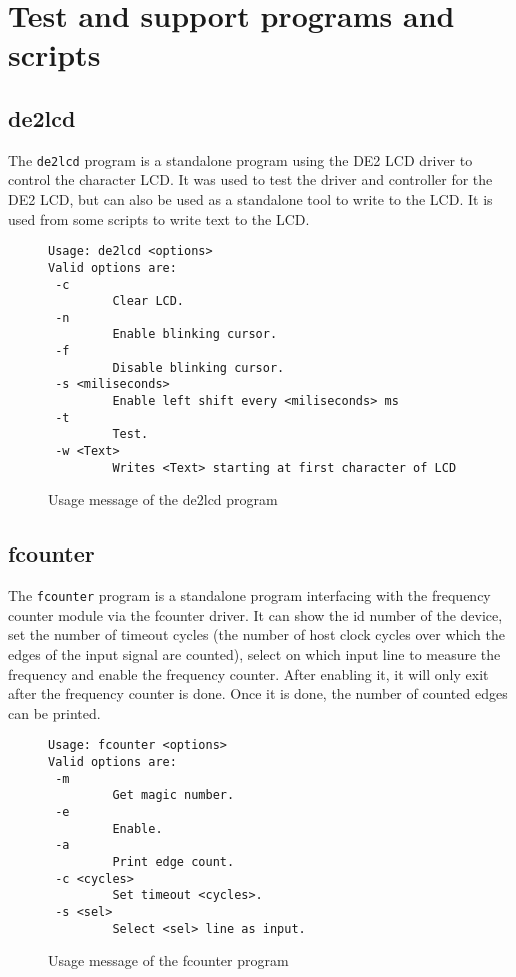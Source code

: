 \newpage
\section{Test and support programs and scripts}
\subsection{de2lcd}
The \texttt{de2lcd} program is a standalone program using the DE2 LCD driver to control
the character LCD. It was used to test the driver and controller for the DE2 LCD, but
can also be used as a standalone tool to write to the LCD. It is used from some scripts
to write text to the LCD.


\begin{figure}[h!]
\lstset{basicstyle=\scriptsize\ttfamily}
\begin{lstlisting}
Usage: de2lcd <options>
Valid options are:
 -c
         Clear LCD.
 -n
         Enable blinking cursor.
 -f
         Disable blinking cursor.
 -s <miliseconds>
         Enable left shift every <miliseconds> ms
 -t
         Test.
 -w <Text>
         Writes <Text> starting at first character of LCD
\end{lstlisting}
\caption{Usage message of the de2lcd program}
\end{figure}


\subsection{fcounter}
The \texttt{fcounter} program is a standalone program interfacing with the frequency
counter module via the fcounter driver. It can show the id number of the device,
set the number of timeout cycles (the number of host clock cycles over which the
edges of the input signal are counted), select on which input line to measure the
frequency and enable the frequency counter. After enabling it, it will only exit
after the frequency counter is done. Once it is done, the number of counted edges
can be printed.

\begin{figure}[h!]
\lstset{basicstyle=\scriptsize\ttfamily}
\begin{lstlisting}
Usage: fcounter <options>
Valid options are:
 -m
         Get magic number.
 -e
         Enable.
 -a
         Print edge count.
 -c <cycles>
         Set timeout <cycles>.
 -s <sel>
         Select <sel> line as input.
\end{lstlisting}
\caption{Usage message of the fcounter program}
\end{figure}


